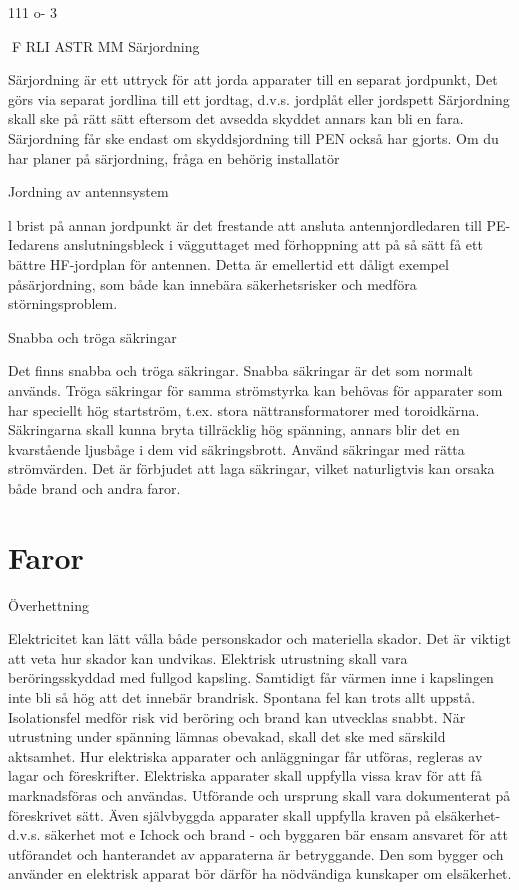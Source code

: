 111 o- 3

F RLI ASTR MM
Särjordning

Särjordning är ett uttryck för att jorda apparater till en separat jordpunkt, Det görs via
separat jordlina till ett jordtag, d.v.s. jordplåt
eller jordspett Särjordning skall ske på rätt
sätt eftersom det avsedda skyddet annars
kan bli en fara.
Särjordning får ske endast om skyddsjordning till PEN också har gjorts. Om du har
planer på särjordning, fråga en behörig installatör

Jordning av antennsystem

l brist på annan jordpunkt är det frestande att
ansluta antennjordledaren till PE-Iedarens
anslutningsbleck i vägguttaget med förhoppning att på så sätt få ett bättre HF-jordplan för
antennen. Detta är emellertid ett dåligt exempel påsärjordning, som både kan innebära säkerhetsrisker och medföra störningsproblem.

Snabba och tröga säkringar

Det finns snabba och tröga säkringar. Snabba
säkringar är det som normalt används. Tröga
säkringar för samma strömstyrka kan behövas för apparater som har speciellt hög startström, t.ex. stora nättransformatorer med
toroidkärna. Säkringarna skall kunna bryta
tillräcklig hög spänning, annars blir det en
kvarstående ljusbåge i dem vid säkringsbrott. Använd säkringar med rätta strömvärden. Det är förbjudet att laga säkringar,
vilket naturligtvis kan orsaka både brand och
andra faror.

\section{Faror}

Överhettning

Elektricitet kan lätt vålla både personskador
och materiella skador. Det är viktigt att veta
hur skador kan undvikas. Elektrisk utrustning skall vara beröringsskyddad med fullgod kapsling. Samtidigt får värmen inne i
kapslingen inte bli så hög att det innebär
brandrisk. Spontana fel kan trots allt uppstå.
Isolationsfel medför risk vid beröring och
brand kan utvecklas snabbt. När utrustning
under spänning lämnas obevakad, skall det
ske med särskild aktsamhet.
Hur elektriska apparater och anläggningar får utföras, regleras av lagar och föreskrifter. Elektriska apparater skall uppfylla
vissa krav för att få marknadsföras och användas. Utförande och ursprung skall vara
dokumenterat på föreskrivet sätt.
Även självbyggda apparater skall uppfylla kraven på elsäkerhet- d.v.s. säkerhet
mot e Ichock och brand - och byggaren bär
ensam ansvaret för att utförandet och
hanterandet av apparaterna är betryggande.
Den som bygger och använder en elektrisk apparat bör därför ha nödvändiga kunskaper om elsäkerhet.

